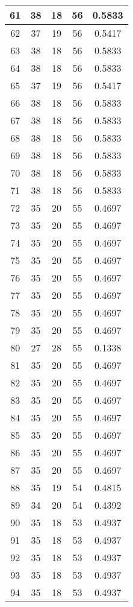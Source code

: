 \documentclass[letterpaper, 12pt]{article}
\begin{document}
\begin{longtable}{|c|c|c|c|c|}
\hline
61 & 38 & 18 & 56 & 0.5833 \\
\hline
62 & 37 & 19 & 56 & 0.5417 \\
\hline
63 & 38 & 18 & 56 & 0.5833 \\
\hline
64 & 38 & 18 & 56 & 0.5833 \\
\hline
65 & 37 & 19 & 56 & 0.5417 \\
\hline
66 & 38 & 18 & 56 & 0.5833 \\
\hline
67 & 38 & 18 & 56 & 0.5833 \\
\hline
68 & 38 & 18 & 56 & 0.5833 \\
\hline
69 & 38 & 18 & 56 & 0.5833 \\
\hline
70 & 38 & 18 & 56 & 0.5833 \\
\hline
71 & 38 & 18 & 56 & 0.5833 \\
\hline
72 & 35 & 20 & 55 & 0.4697 \\
\hline
73 & 35 & 20 & 55 & 0.4697 \\
\hline
74 & 35 & 20 & 55 & 0.4697 \\
\hline
75 & 35 & 20 & 55 & 0.4697 \\
\hline
76 & 35 & 20 & 55 & 0.4697 \\
\hline
77 & 35 & 20 & 55 & 0.4697 \\
\hline
78 & 35 & 20 & 55 & 0.4697 \\
\hline
79 & 35 & 20 & 55 & 0.4697 \\
\hline
80 & 27 & 28 & 55 & 0.1338 \\
\hline
81 & 35 & 20 & 55 & 0.4697 \\
\hline
82 & 35 & 20 & 55 & 0.4697 \\
\hline
83 & 35 & 20 & 55 & 0.4697 \\
\hline
84 & 35 & 20 & 55 & 0.4697 \\
\hline
85 & 35 & 20 & 55 & 0.4697 \\
\hline
86 & 35 & 20 & 55 & 0.4697 \\
\hline
87 & 35 & 20 & 55 & 0.4697 \\
\hline
88 & 35 & 19 & 54 & 0.4815 \\
\hline
89 & 34 & 20 & 54 & 0.4392 \\
\hline
90 & 35 & 18 & 53 & 0.4937 \\
\hline
91 & 35 & 18 & 53 & 0.4937 \\
\hline
92 & 35 & 18 & 53 & 0.4937 \\
\hline
93 & 35 & 18 & 53 & 0.4937 \\
\hline
94 & 35 & 18 & 53 & 0.4937 \\

\end{longtable}
\end{document}
